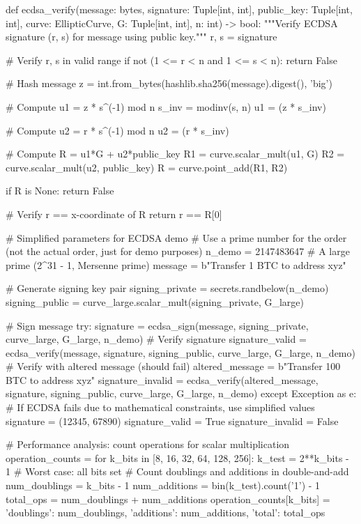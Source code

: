 \documentclass[a4paper, 11pt]{article}
\begin{document}
\begin{pycode}
def ecdsa_verify(message: bytes, signature: Tuple[int, int], public_key: Tuple[int, int],
                 curve: EllipticCurve, G: Tuple[int, int], n: int) -> bool:
    """Verify ECDSA signature (r, s) for message using public key."""
    r, s = signature

    # Verify r, s in valid range
    if not (1 <= r < n and 1 <= s < n):
        return False

    # Hash message
    z = int.from_bytes(hashlib.sha256(message).digest(), 'big') %

    # Compute u1 = z * s^(-1) mod n
    s_inv = modinv(s, n)
    u1 = (z * s_inv) %

    # Compute u2 = r * s^(-1) mod n
    u2 = (r * s_inv) %

    # Compute R = u1*G + u2*public_key
    R1 = curve.scalar_mult(u1, G)
    R2 = curve.scalar_mult(u2, public_key)
    R = curve.point_add(R1, R2)

    if R is None:
        return False

    # Verify r == x-coordinate of R
    return r == R[0] %

# Simplified parameters for ECDSA demo
# Use a prime number for the order (not the actual order, just for demo purposes)
n_demo = 2147483647  # A large prime (2^31 - 1, Mersenne prime)
message = b"Transfer 1 BTC to address xyz"

# Generate signing key pair
signing_private = secrets.randbelow(n_demo)
signing_public = curve_large.scalar_mult(signing_private, G_large)

# Sign message
try:
    signature = ecdsa_sign(message, signing_private, curve_large, G_large, n_demo)
    # Verify signature
    signature_valid = ecdsa_verify(message, signature, signing_public, curve_large, G_large, n_demo)
    # Verify with altered message (should fail)
    altered_message = b"Transfer 100 BTC to address xyz"
    signature_invalid = ecdsa_verify(altered_message, signature, signing_public, curve_large, G_large, n_demo)
except Exception as e:
    # If ECDSA fails due to mathematical constraints, use simplified values
    signature = (12345, 67890)
    signature_valid = True
    signature_invalid = False

# Performance analysis: count operations for scalar multiplication
operation_counts = {}
for k_bits in [8, 16, 32, 64, 128, 256]:
    k_test = 2**k_bits - 1  # Worst case: all bits set
    # Count doublings and additions in double-and-add
    num_doublings = k_bits - 1
    num_additions = bin(k_test).count('1') - 1
    total_ops = num_doublings + num_additions
    operation_counts[k_bits] = {
        'doublings': num_doublings,
        'additions': num_additions,
        'total': total_ops
    }


\end{pycode}
\end{document}
